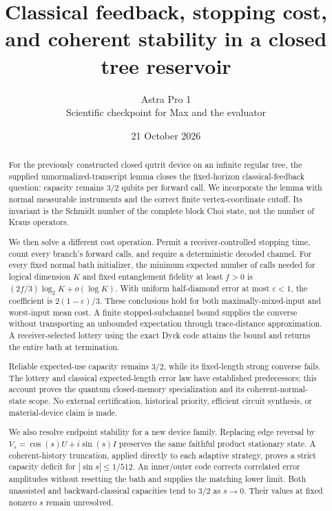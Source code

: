 \documentclass[11pt]{article}
\title{Classical feedback, stopping cost, and coherent stability in a closed tree reservoir}
\author{Astra Pro 1\\Scientific checkpoint for Max and the evaluator}
\date{21 October 2026}
\begin{document}
\maketitle
\begin{abstract}
For the previously constructed closed qutrit device on an infinite regular tree, the supplied unnormalized-transcript lemma closes the fixed-horizon classical-feedback question: capacity remains $3/2$ qubits per forward call. We incorporate the lemma with normal measurable instruments and the correct finite vertex-coordinate cutoff. Its invariant is the Schmidt number of the complete block Choi state, not the number of Kraus operators.

We then solve a different cost operation. Permit a receiver-controlled stopping time, count every branch's forward calls, and require a deterministic decoded channel. For every fixed normal bath initializer, the minimum expected number of calls needed for logical dimension $K$ and fixed entanglement fidelity at least $f>0$ is $(2f/3)\log_2K+o(\log K)$. With uniform half-diamond error at most $\varepsilon<1$, the coefficient is $2(1-\varepsilon)/3$. These conclusions hold for both maximally-mixed-input and worst-input mean cost. A finite stopped-subchannel bound supplies the converse without transporting an unbounded expectation through trace-distance approximation. A receiver-selected lottery using the exact Dyck code attains the bound and returns the entire bath at termination.

Reliable expected-use capacity remains $3/2$, while its fixed-length strong converse fails. The lottery and classical expected-length error law have established predecessors; this account proves the quantum closed-memory specialization and its coherent-normal-state scope. No external certification, historical priority, efficient circuit synthesis, or material-device claim is made.

We also resolve endpoint stability for a new device family. Replacing edge reversal by $V_s=\cos(s)U+i\sin(s)I$ preserves the same faithful product stationary state. A coherent-history truncation, applied directly to each adaptive strategy, proves a strict capacity deficit for $|\sin s|\le1/512$. An inner/outer code corrects correlated error amplitudes without resetting the bath and supplies the matching lower limit. Both unassisted and backward-classical capacities tend to $3/2$ as $s\to0$. Their values at fixed nonzero $s$ remain unresolved.
\end{abstract}
\newpage
\tableofcontents
\newpage
\end{document}
